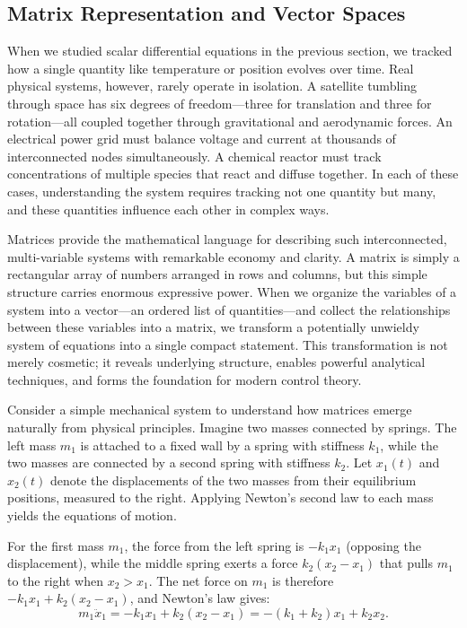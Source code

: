 \subsection{Matrix Representation and Vector Spaces}

When we studied scalar differential equations in the previous section, we tracked how a single quantity like temperature or position evolves over time. Real physical systems, however, rarely operate in isolation. A satellite tumbling through space has six degrees of freedom---three for translation and three for rotation---all coupled together through gravitational and aerodynamic forces. An electrical power grid must balance voltage and current at thousands of interconnected nodes simultaneously. A chemical reactor must track concentrations of multiple species that react and diffuse together. In each of these cases, understanding the system requires tracking not one quantity but many, and these quantities influence each other in complex ways.

Matrices provide the mathematical language for describing such interconnected, multi-variable systems with remarkable economy and clarity. A matrix is simply a rectangular array of numbers arranged in rows and columns, but this simple structure carries enormous expressive power. When we organize the variables of a system into a vector---an ordered list of quantities---and collect the relationships between these variables into a matrix, we transform a potentially unwieldy system of equations into a single compact statement. This transformation is not merely cosmetic; it reveals underlying structure, enables powerful analytical techniques, and forms the foundation for modern control theory.

Consider a simple mechanical system to understand how matrices emerge naturally from physical principles. Imagine two masses connected by springs. The left mass $m_1$ is attached to a fixed wall by a spring with stiffness $k_1$, while the two masses are connected by a second spring with stiffness $k_2$. Let $x_1(t)$ and $x_2(t)$ denote the displacements of the two masses from their equilibrium positions, measured to the right. Applying Newton's second law to each mass yields the equations of motion.

For the first mass $m_1$, the force from the left spring is $-k_1 x_1$ (opposing the displacement), while the middle spring exerts a force $k_2(x_2 - x_1)$ that pulls $m_1$ to the right when $x_2 > x_1$. The net force on $m_1$ is therefore $-k_1 x_1 + k_2(x_2 - x_1)$, and Newton's law gives:
\[
m_1 \ddot{x}_1 = -k_1 x_1 + k_2(x_2 - x_1) = -(k_1 + k_2)x_1 + k_2 x_2.
\]

